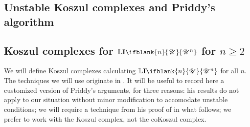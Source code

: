 \documentclass[10pt]{article}
\newcommand{\LL}[1]{\ifblank{#1}{\scrK}{\scrK^{#1}}}
\newcommand{\nontop}[1]{\ifblank{#1}{\scrU}{\scrU^{#1}}}
\newcommand{\Ind}[2][]{\mathbf{I}{#2}_{#1}}%
\newcommand{\derived}{\mathbb{L}}
\renewcommand{\Q}{Q}
\newcommand{\minDim}{m}
\begin{document}
\begin{KoszulComplexes2plus}
\section{Unstable Koszul complexes and Priddy's algorithm}
\subsection{Koszul complexes for $\derived\Ind{\nontop{n}}$ for $n\geq2$}
We will define Koszul complexes calculating $\derived\Ind{\nontop{n}}$ for all $n$. The techniques we will use originate in \cite{PriddyKoszul.pdf}. It will be useful to record here a customized version of Priddy's arguments, for three reasons: his results do not apply to our situation without minor modification to accomodate unstable conditions; we will require a technique from his proof of \cite[Thm 5.3]{PriddyKoszul.pdf} in what follows; we prefer to work with the Koszul complex, not the coKoszul complex.



\end{KoszulComplexes2plus}
\end{document}

